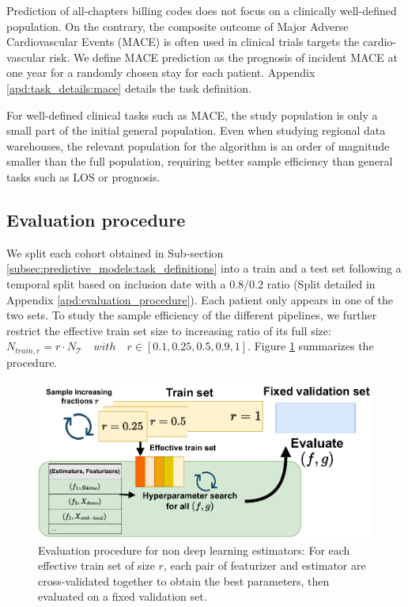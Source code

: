 \documentclass[french,12pt,twoside,a4paper]{book}
\begin{document}
Prediction of all-chapters billing codes does not focus on a clinically
well-defined population. On the contrary, the composite outcome of Major Adverse
Cardiovascular Events (MACE) is often used in clinical trials targets the
cardio-vascular risk.
We define MACE prediction as the prognosis of incident MACE at one year for a
randomly chosen stay for each patient. Appendix \ref{apd:task_details:mace}
details the task definition.

For well-defined clinical tasks such as MACE, the study population is only a
small part of the initial general population. Even when studying regional data
warehouses, the relevant population for the algorithm is an order of magnitude
smaller than the full population, requiring better sample efficiency than
general tasks such as LOS or prognosis.


\subsection{Evaluation procedure}\label{subsec:predictive_models:evaluation_pipeline}

We split each cohort obtained in Sub-section
\ref{subsec:predictive_models:task_definitions} into a train and a test set
following a temporal split based on inclusion date with a 0.8/0.2 ratio (Split
detailed in Appendix \ref{apd:evaluation_procedure}). Each patient only
appears in one of the two sets. To study the sample efficiency of the different
pipelines, we further restrict the effective train set size to increasing ratio
of its full size: $N_{train, r}= r \cdot N_{\mathcal{T}} \quad with \quad r \in
  [0.1, 0.25, 0.5, 0.9, 1]$. Figure \ref{fig:evaluation_procedure} summarizes the
procedure.

\begin{figure}[!h]
  \centering
  \includegraphics[width=0.7\linewidth]{img/chapter_3/selection_procedure.pdf}
  \caption{Evaluation procedure for non deep learning estimators: For each
    effective train set of size $r$, each pair of featurizer and estimator are
    cross-validated together to obtain the best parameters, then evaluated on a
    fixed validation set.}\label{fig:evaluation_procedure}
\end{figure}
\end{document}
